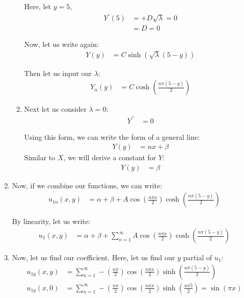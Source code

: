 \begin{enumerate}
\begin{enumerate}
  Here, let $y = 5$,
  \begin{align}
    Y^\prime(5) & = +D \sqrt \lambda = 0\\
    & = D = 0
  \end{align}

  Now, let us write again:
  \begin{align}
    Y(y) & = C \sinh(\sqrt \lambda (5 - y))
  \end{align}

  Then let us input our $\lambda$:
  \begin{align}
    Y_{n}(y) & = C \cosh\left(\frac{n \pi (5 - y)}{2}\right)
  \end{align}
  \item Next let us consider $\lambda = 0$:
  \begin{align}
    Y^{\prime\prime} & = 0
  \end{align}

  Using this form, we can write the form of a general line:
  \begin{align}
    Y(y) & = nx + \beta
  \end{align}
  Similar to $X$, we will derive a constant for $Y$:
  \begin{align}
    Y(y) & = \beta
  \end{align}

\end{enumerate}

\item Now, if we combine our functions, we can write:
%
\begin{align}
  u_{1n}(x, y) & = \alpha + \beta +
  A\cos\left(\frac{n \pi x}{2}\right)
  \cosh\left(\frac{n \pi(5 - y)}{2}\right)
\end{align}

By linearity, let us write:
%
\begin{align}
  u_{1}(x, y) & = \alpha + \beta + \sum^\infty_{n = 1}
  A\cos\left(\frac{n \pi x}{2}\right)
  \cosh\left(\frac{n \pi(5 - y)}{2}\right)
\end{align}

\item Now, let us find our coefficient. Here, let us find our $y$ partial of $u_1$:
%
\begin{align}
  u_{1y}(x, y) & = \sum^\infty_{n = 1} -\left(\frac{n \pi}{2}\right)\cos\left(\frac{n \pi x}{2}\right) \sinh\left( \frac{n \pi(5 - y)}{2} \right)\\
  u_{1y}(x, 0) & = \sum^\infty_{n = 1} -\left(\frac{n \pi}{2}\right)\cos\left(\frac{n \pi x}{2}\right) \sinh\left( \frac{n \pi 5}{2} \right) = \sin(\pi x)
\end{align}


\end{enumerate}
